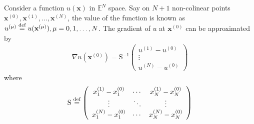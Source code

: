 \documentclass[a4paper,12pt,dvips]{article}
\newcommand*\defeq{\buildrel{\text{def}}\over{=}}
\begin{document}
Consider a function $u(\mathbf{x})$ in $\mathbb{E}^N$ space.  Say on $N+1$
non-colinear points $\mathbf{x}^{(0)}, \mathbf{x}^{(1)}, \ldots,
\mathbf{x}^{(N)}$, the value of the function is known as $u^{(\mu)} \defeq
u(\mathbf{x}^{(\mu)}), \mu = 0, 1, \ldots, N$.  The gradient of $u$ at
$\mathbf{x}^{(0)}$ can be approximated by
\begin{align}
\nabla u(\mathbf{x}^{(0)}) = \mathrm{S}^{-1} \left(\begin{array}{c}
  u^{(1)} - u^{(0)} \\ \vdots \\ u^{(N)} - u^{(0)}
\end{array}\right)
\end{align}
where
\begin{align}
\mathrm{S} \defeq \left(\begin{array}{ccc}
  x^{(1)}_1 - x^{(0)}_1 &
  \cdots &
  x^{(1)}_N - x^{(0)}_N \\
  \vdots & \ddots & \vdots \\
  x^{(N)}_1 - x^{(0)}_1 &
  \cdots &
  x^{(N)}_N - x^{(0)}_N
\end{array}\right)
\end{align}



\end{document}
